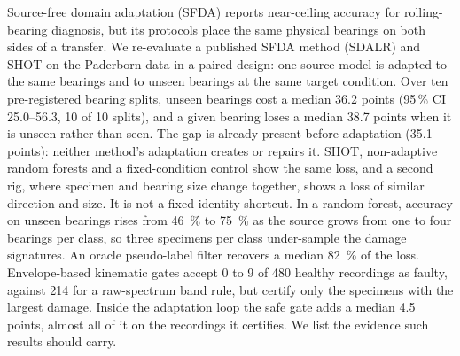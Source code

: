 Source-free domain adaptation (SFDA) reports near-ceiling accuracy for rolling-bearing diagnosis, but its protocols place
the same physical bearings on both sides of a transfer. We re-evaluate a published SFDA method (SDALR) and SHOT on the
Paderborn data in a paired design: one source model is adapted to the same bearings and to unseen bearings at the same
target condition. Over ten pre-registered bearing splits, unseen bearings cost a median 36.2 points (95\,\% CI 25.0--56.3,
10 of 10 splits), and a given bearing loses a median 38.7 points when it is unseen rather than seen. The gap is already
present before adaptation (35.1 points): neither method's adaptation creates or repairs it. SHOT, non-adaptive random
forests and a fixed-condition control show the same loss, and a second rig, where specimen and bearing size change together, shows a loss of similar direction and size. It is not a
fixed identity shortcut. In a random forest, accuracy on unseen
bearings rises from \SI{46}{\percent} to \SI{75}{\percent} as the source grows from one to four bearings per class, so
three specimens per class under-sample the damage signatures. An oracle pseudo-label filter recovers a median
\SI{82}{\percent} of the loss. Envelope-based kinematic gates accept 0 to 9 of 480 healthy recordings as faulty, against
214 for a raw-spectrum band rule, but certify only the specimens with the largest damage. Inside the adaptation loop the
safe gate adds a median 4.5 points, almost all of it on the recordings it certifies. We list the evidence such results
should carry.
